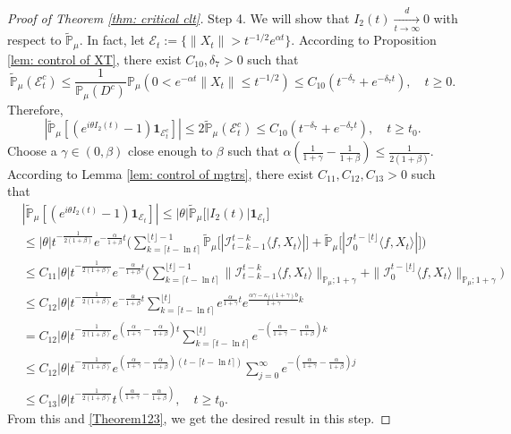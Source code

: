 \documentclass[12pt,a4paper]{amsart}
\theoremstyle{plain}
\theoremstyle{definition}
\numberwithin{equation}{section}
\begin{document}
\begin{proof}[Proof of Theorem \ref{thm: critical clt}]
    Step 4.
    We will show that $I_2(t) \xrightarrow[t\to \infty]{d} 0$ with respect to $\mathbb{\widetilde{P}}_{\mu}$.
    In fact, let $\mathcal{E}_t:=\{\|X_t\|>t^{-1/2}e^{\alpha t}\}$. According to Proposition \ref{lem: control of XT}, there exist $C_{10}, \delta_7>0$ such that
\begin{equation}
    \mathbb{\widetilde{P}}_{\mu}(\mathcal{E}^c_t)\leq \frac{1}{\mathbb{P}_{\mu}(D^c)}\mathbb{P}_{\mu}(0<e^{-\alpha t}\|X_t\|\leq t^{-1/2})\leq C_{10}( t^{-\delta_7}+e^{-\delta_7 t}), \quad t\geq0.
\end{equation}
    Therefore,
\begin{equation}\label{Theorem123}
    |\mathbb{\widetilde{P}}_{\mu}[(e^{i\theta I_2(t)}-1)\mathbf{1}_{\mathcal{E}^c_t}]|
    \leq 2\mathbb{\widetilde{P}}_{\mu}(\mathcal{E}^c_t)\leq C_{10}(t^{-\delta_7}+e^{-\delta_7 t}),
    \quad t\geq t_0.
\end{equation}
    Choose a $\gamma\in (0,\beta)$ close enough to $\beta$ such that $\alpha(\frac{1}{1+\gamma}-\frac{1}{1+\beta})\leq \frac{1}{2(1+\beta)}$.
	According to Lemma \ref{lem: control of mgtrs}, there exist $C_{11},C_{12},C_{13}>0$ such that
\begin{align}
    &|\mathbb{\widetilde{P}}_{\mu} [ (e^{i\theta I_2(t)}-1)\mathbf{1}_{\mathcal{E}_t}]|
    \leq |\theta| \mathbb{\widetilde{P}}_{\mu} \big[ |I_2(t)|\mathbf{1}_{\mathcal{E}_t}\big]
    \\&\leq|\theta| t^{-\frac{1}{2(1+\beta)}}e^{-\frac{\alpha}{1+\beta}t}\Big(\sum_{k=\lceil t-\ln t \rceil}^{\lfloor t \rfloor - 1}\mathbb{\widetilde{P}}_{\mu}\big[| \mathcal{I}_{t-k-1}^{t-k}\langle f,X_t\rangle|\big] + \mathbb{\widetilde{P}}_{\mu}\big[| \mathcal{I}_{0}^{t-\lfloor t\rfloor}\langle f,X_t\rangle|\big]\Big)
    \\& \leq C_{11} |\theta| t^{-\frac{1}{2(1+\beta)}}e^{-\frac{\alpha}{1+\beta}t}\Big(\sum_{k=\lceil t-\ln t \rceil}^{\lfloor t \rfloor - 1}\|\mathcal{I}_{t-k-1}^{t-k}\langle f,X_t\rangle\|_{\mathbb P_\mu; 1+\gamma} + \|\mathcal I_0^{t-\lfloor t \rfloor} \langle f, X_t\rangle\|_{\mathbb P_\mu;1+\gamma}\Big)
    \\ &\leq C_{12} |\theta| t^{-\frac{1}{2(1+\beta)}}e^{-\frac{\alpha}{1+\beta}t}\sum_{k=\lceil t-\ln t \rceil}^{\lfloor t \rfloor}e^{\frac{\alpha}{1+\gamma}t}e^{\frac{\alpha\gamma-\kappa_f(1+\gamma)b}{1+\gamma}k}\\
    &= C_{12} |\theta| t^{-\frac{1}{2(1+\beta)}}e^{(\frac{\alpha }{1+\gamma}-\frac{\alpha }{1+\beta})t} \sum_{k=\lceil t-\ln t \rceil}^{\lfloor t \rfloor}e^{-(\frac{\alpha}{1+\gamma}-\frac{\alpha}{1+\beta})k}\\
    &\leq C_{12} |\theta| t^{-\frac{1}{2(1+\beta)}}e^{(\frac{\alpha }{1+\gamma}-\frac{\alpha }{1+\beta})(t - \lceil t - \ln t\rceil)} \sum_{j=0}^{\infty}e^{-(\frac{\alpha}{1+\gamma}-\frac{\alpha}{1+\beta})j}\\
    &\leq C_{13}|\theta| t^{-\frac{1}{2(1+\beta)}}t^{(\frac{\alpha}{1+\gamma}- \frac{\alpha}{1+\beta})},
    \quad t\geq t_0.
\end{align}
	From this and \eqref{Theorem123}, we get the desired result in this step.


\end{proof}
\end{document}
